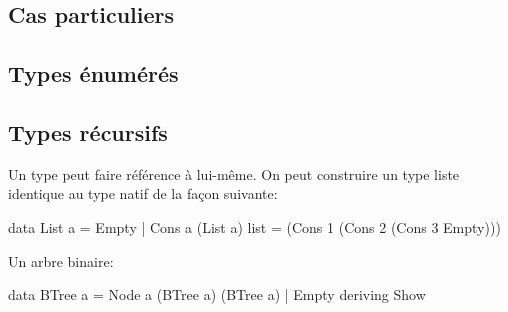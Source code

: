 \subsection{Cas particuliers}

\subsection{Types énumérés}

\subsection{Types récursifs}

Un type peut faire référence à lui-même. On peut construire un type liste identique au type natif de la façon suivante:

\begin{haskellcode}
data List a = Empty | Cons a (List a)
list = (Cons 1 (Cons 2 (Cons 3 Empty)))
\end{haskellcode}

Un arbre binaire:

\begin{haskellcode}
data BTree a = Node a (BTree a) (BTree a) | Empty deriving Show
\end{haskellcode}
